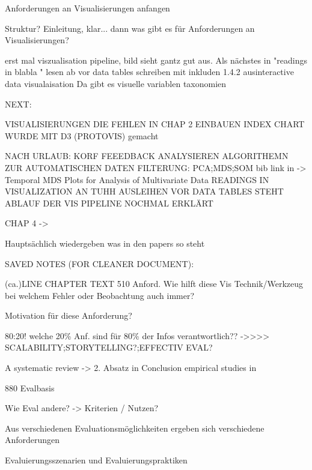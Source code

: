 

Anforderungen an Visualisierungen anfangen

	Struktur?
	Einleitung, klar...
	dann was gibt es für Anforderungen an Visualisierungen?
	
	erst mal viszualisation pipeline, bild sieht gantz gut aus. Als nächstes in "readings in blabla " lesen ab vor data tables
	schreiben mit inkluden 1.4.2 ausinteractive data visualaisation
	Da gibt es visuelle variablen
	taxonomien


NEXT:

	VISUALISIERUNGEN DIE FEHLEN IN CHAP 2 EINBAUEN
	INDEX CHART WURDE MIT D3 (PROTOVIS) gemacht


	NACH URLAUB:
	KORF FEEEDBACK ANALYSIEREN
	ALGORITHEMN ZUR AUTOMATISCHEN DATEN FILTERUNG: PCA;MDS;SOM bib link in -> Temporal MDS Plots for Analysis of Multivariate Data
	READINGS IN VISUALIZATION AN TUHH AUSLEIHEN
	VOR DATA TABLES STEHT ABLAUF DER VIS PIPELINE NOCHMAL ERKLÄRT

CHAP 4 ->

Hauptsächlich wiedergeben was in den papers so steht




SAVED NOTES (FOR CLEANER DOCUMENT):

(ca.)LINE	CHAPTER		TEXT
	510		Anford.		Wie hilft diese Vis Technik/Werkzeug bei welchem Fehler oder Beobachtung auch immer?

						Motivation für diese Anforderung?

						80:20! welche 20\% Anf. sind für 80\% der Infos verantwortlich??\newline
						->>>> SCALABILITY;STORYTELLING?;EFFECTIV EVAL?

						A systematic review -> 2. Absatz in Conclusion \cite{isenberg_systematic_2013} \newline
						empirical studies in \cite{lam_empirical_2012}

	880		Evalbasis	

						Wie Eval andere? -> Kriterien / Nutzen?

						Aus verschiedenen Evaluationsmöglichkeiten ergeben sich verschiedene Anforderungen

						Evaluierungsszenarien und Evaluierungspraktiken


